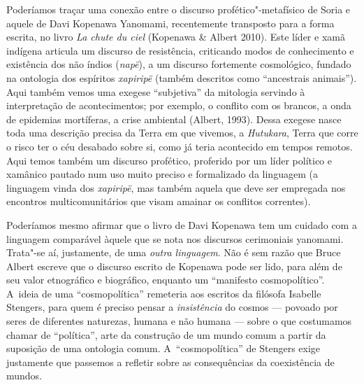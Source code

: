 Poderíamos traçar uma conexão entre o discurso profético"-metafísico de
Soria e aquele de Davi Kopenawa Yanomami, recentemente transposto para
a forma escrita, no livro \emph{La chute du ciel} (Kopenawa \& Albert 2010).
Este líder e xamã indígena articula um discurso de resistência,
criticando modos de conhecimento e existência dos não índios (\emph{napë}), a
um discurso fortemente cosmológico, fundado na ontologia dos espíritos
\emph{xapiripë} (também descritos como ``ancestrais animais''). Aqui também
vemos uma exegese ``subjetiva'' da mitologia servindo à interpretação de
acontecimentos; por exemplo, o conflito com os brancos, a onda de
epidemias mortíferas, a crise ambiental (Albert, 1993). Dessa exegese
nasce toda uma descrição precisa da Terra em que vivemos, a \emph{Hutukara},
Terra que corre o risco ter o céu desabado sobre si, como já teria
acontecido em tempos remotos. Aqui temos também um discurso profético,
proferido por um líder político e xamânico pautado num uso muito
preciso e formalizado da linguagem (a linguagem vinda dos \emph{xapiripë}, mas
também aquela que deve ser empregada nos encontros multicomunitários
que visam amainar os conflitos correntes). 

Poderíamos mesmo afirmar que o livro de Davi Kopenawa tem um cuidado com
a linguagem comparável àquele que se nota nos discursos cerimoniais
yanomami. Trata"-se aí, justamente, de uma \emph{outra linguagem}. Não é sem
razão que Bruce Albert escreve que o discurso escrito de Kopenawa pode
ser lido, para além de seu valor etnográfico e biográfico, enquanto um
``manifesto cosmopolítico''. A~ideia de uma ``cosmopolítica'' remeteria aos
escritos da filósofa Isabelle Stengers, para quem é preciso pensar a
\emph{insistência} do cosmos --- povoado por seres de diferentes naturezas,
humana e não humana --- sobre o que costumamos chamar de ``política'', arte
da construção de um mundo comum a partir da suposição de uma ontologia
comum. A~``cosmopolítica'' de Stengers exige justamente que passemos a
refletir sobre as consequências da coexistência de mundos.

